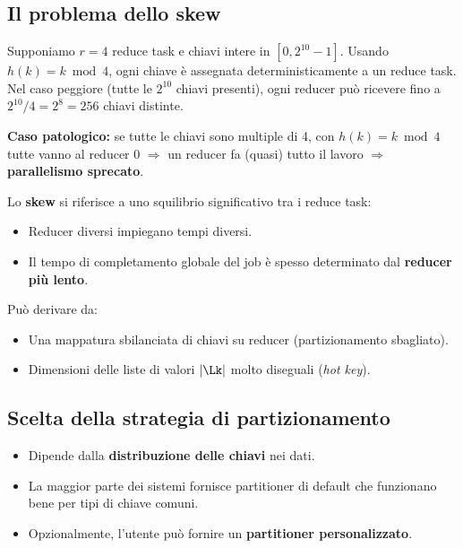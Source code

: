 \subsection{Il problema dello skew}

\begin{esempio}
  Supponiamo $r = 4$ reduce task e chiavi intere in $[0, 2^{10}-1]$.
  Usando $h(k) = k \bmod 4$, ogni chiave è assegnata deterministicamente
  a un reduce task. Nel caso peggiore (tutte le $2^{10}$ chiavi presenti),
  ogni reducer può ricevere fino a $2^{10}/4 = 2^8 = 256$ chiavi distinte.

  \textbf{Caso patologico:} se tutte le chiavi sono multiple di 4, con
  $h(k) = k \bmod 4$ tutte vanno al reducer 0 $\Rightarrow$ un reducer
  fa (quasi) tutto il lavoro $\Rightarrow$ \textbf{parallelismo sprecato}.
\end{esempio}

\begin{definizione}[-- Skew]
  Lo \textbf{skew} si riferisce a uno squilibrio significativo tra i reduce task:
  \begin{itemize}
    \item Reducer diversi impiegano tempi diversi.
    \item Il tempo di completamento globale del job è spesso determinato
      dal \textbf{reducer più lento}.
  \end{itemize}
  Può derivare da:
  \begin{itemize}
    \item Una mappatura sbilanciata di chiavi su reducer (partizionamento sbagliato).
    \item Dimensioni delle liste di valori $|\Lk|$ molto diseguali
      (\emph{hot key}).
  \end{itemize}
\end{definizione}

\subsection{Scelta della strategia di partizionamento}

\begin{itemize}
  \item Dipende dalla \textbf{distribuzione delle chiavi} nei dati.
  \item La maggior parte dei sistemi fornisce partitioner di default che
    funzionano bene per tipi di chiave comuni.
  \item Opzionalmente, l'utente può fornire un \textbf{partitioner
    personalizzato}.
\end{itemize}

